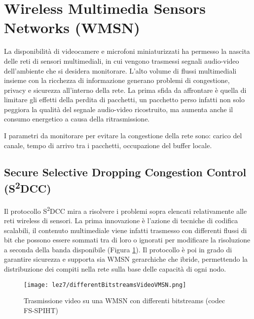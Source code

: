 \section{Wireless Multimedia Sensors Networks (WMSN)}

	La disponibilità di videocamere e microfoni miniaturizzati ha permesso la nascita delle reti di sensori multimediali, in cui vengono trasmessi segnali audio-video dell'ambiente che si desidera monitorare.
	L'alto volume di flussi multimediali insieme con la ricchezza di informazione generano problemi di congestione, privacy e sicurezza all'interno della rete.
	La prima sfida da affrontare è quella di limitare gli effetti della perdita di pacchetti, un pacchetto perso infatti non solo peggiora la qualità del segnale audio-video ricostruito, ma aumenta anche il consumo energetico a causa della ritrasmissione.
	
	I parametri da monitorare per evitare la congestione della rete sono: carico del canale, tempo di arrivo tra i pacchetti, occupazione del buffer locale.
	
	
\subsection{Secure Selective Dropping Congestion Control (S\textsuperscript{2}DCC)}

	Il protocollo S\textsuperscript{2}DCC mira a risolvere i problemi sopra elencati relativamente alle reti wireless di sensori.
	La prima innovazione è l'azione di tecniche di codifica scalabili, il contenuto multimediale viene infatti trasmesso con differenti flussi  di bit che possono essere sommati tra di loro o ignorati per modificare la risoluzione a seconda della banda disponibile (Figura \ref{fig:WMSN-trasmissioneBitstreams}).
	Il protocollo è poi in grado di garantire sicurezza e supporta sia WMSN gerarchiche che ibride, permettendo la distribuzione dei compiti nella rete sulla base delle capacità di ogni nodo.
	
	\begin{figure}
		\centering
		\texttt{[image: lez7/differentBitstreamsVideoVMSN.png]}
		\caption{Trasmissione video su una WMSN con differenti bitstreams (codec FS-SPIHT)}
		\label{fig:WMSN-trasmissioneBitstreams}
	\end{figure}
